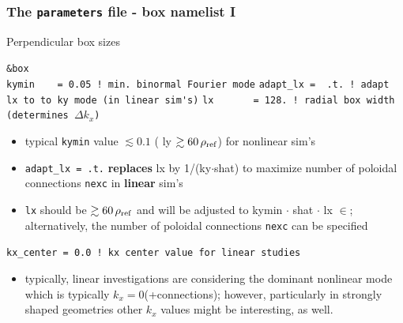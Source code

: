 \documentclass[10pt]{beamer}
\begin{document}


\begin{frame}[fragile]
  \frametitle{The {\tt parameters} file - box namelist I}

\begin{block}{Perpendicular box sizes}

\begin{block}

\verb|&box|\\
\verb|kymin    = 0.05 ! min. binormal Fourier mode|
\verb|adapt_lx =  .t. ! adapt lx to to ky mode (in linear sim's)|
\verb|lx       = 128. ! radial box width (determines |$\Delta k_x$\verb|)|
\end{block}

\begin{itemize}
\item typical {\tt kymin} value $\lesssim 0.1$ ( ly $\gtrsim 60\,\rho_{\rm ref}$) for nonlinear sim's
\item {\tt adapt\_lx = .t.} {\bf replaces} lx by 1/(ky$\cdot$shat)
 to maximize number of poloidal connections {\tt nexc} in {\bf linear} sim's
\item {\tt lx} should be $\gtrsim 60\,\rho_{\rm ref}$ and will be adjusted to 
kymin $\cdot$ shat $\cdot$ lx $\in$\Nat ;\\
alternatively, the number of poloidal connections {\tt nexc} can be specified
\end{itemize}

\begin{block}

\verb|kx_center = 0.0 ! kx center value for linear studies|
\end{block}
\begin{itemize}
\item typically, linear investigations are considering the dominant nonlinear mode which 
is typically $k_x=0$(+connections); however, particularly in strongly shaped geometries other $k_x$ 
values might be interesting, as well.
\end{itemize}


\end{block}
\end{frame}

\end{document}
